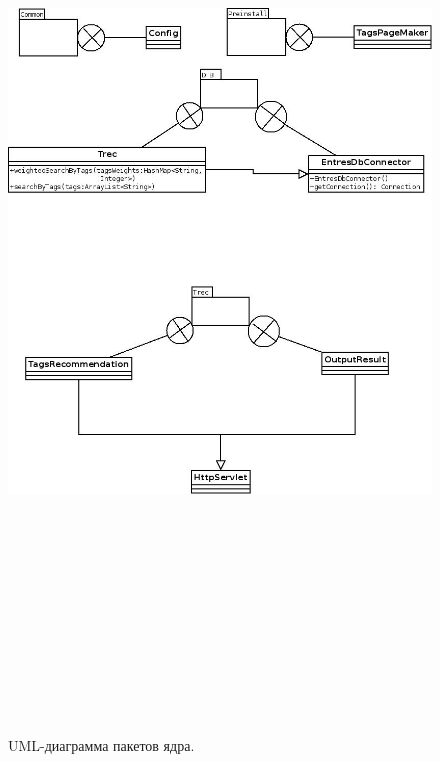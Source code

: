 \begin{figure}
\caption{UML-диаграмма пакетов ядра.}
\label{entres-uml2}
\begin{center}
  \includegraphics[width=7in,height=10in]{pics/core-packs2.jpeg}
\end{center}
\end{figure}

